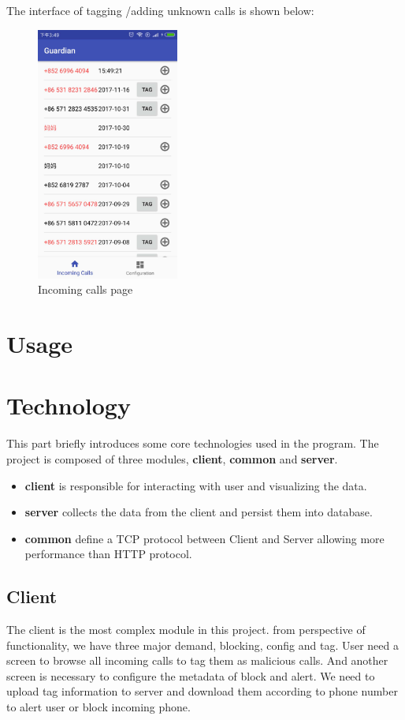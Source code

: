 \documentclass{article}
\begin{document}
The interface of tagging /adding unknown calls is shown below:
\begin{figure}[H]
    \centering 
    \includegraphics[width=0.418\textwidth]{images/calls.jpg}
    \caption{Incoming calls page}
    \label{image_calls}
\end{figure}

\section{Usage}

\section{Technology}
This part briefly introduces some core technologies used in the program. The project is composed of three modules, \textbf{client}, \textbf{common} and \textbf{server}.

\begin{itemize}
    \item \textbf{client} is responsible for interacting with user and visualizing the data.
    \item \textbf{server} collects the data from the client and persist them into database.
    \item \textbf{common} define a TCP protocol between Client and Server allowing more performance than HTTP protocol.
\end{itemize}

\subsection{Client}
The client is the most complex module in this project. from perspective of functionality, we have three major demand, blocking, config and tag. User need a screen to browse all incoming calls to tag them as malicious calls. And another screen is necessary to configure the metadata of block and alert. We need to upload tag information to server and download them according to phone number to alert user or block incoming phone.
\end{document}
